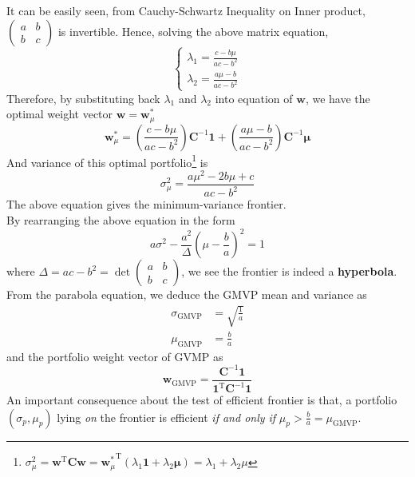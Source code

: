 \documentclass[12pt]{article}
\theoremstyle{definition}
\begin{document}
It can be easily seen, from Cauchy-Schwartz Inequality on Inner product, $\begin{pmatrix}a&b\\b&c\end{pmatrix}$ is invertible. Hence, solving the above matrix equation,
\[
\begin{cases}
\lambda_1=\frac{c-b\mu}{ac-b^2}\\
\lambda_2=\frac{a\mu-b}{ac-b^2}
\end{cases}
\]
Therefore, by substituting back $\lambda_1$ and $\lambda_2$ into equation of $\mathbf{w}$, we have the optimal weight vector $\mathbf{w}=\mathbf{w}_\mu^\ast$
\[
\mathbf{w}_\mu^\ast = \left(\frac{c-b\mu}{ac-b^2}\right)\mathbf{C}^{-1}\mathbf{1}+\left(\frac{a\mu-b}{ac-b^2}\right)\mathbf{C}^{-1}\bm{\mu}
\]
And variance of this optimal portfolio\footnote{$\sigma_\mu^2=\mathbf{w}^\text{T}\mathbf{Cw} = {\mathbf{w}_\mu^\ast}^\text{T}(\lambda_1\mathbf{1}+\lambda_2\bm{\mu})=\lambda_1+\lambda_2\mu$} is
\[
\sigma_\mu^2 = \frac{a\mu^2-2b\mu+c}{ac-b^2}
\]
The above equation gives the minimum-variance frontier.\\By rearranging the above equation in the form
\[
a\sigma^2-\frac{a^2}{\Delta}(\mu-\frac{b}{a})^2=1
\]
where $\Delta = ac-b^2=\det\begin{pmatrix}a&b\\b&c\end{pmatrix}$, we see the frontier is indeed a \textbf{hyperbola}.\\From the parabola equation, we deduce the GMVP mean and variance as
\begin{align*}
\sigma_\text{GMVP}&=\sqrt{\frac{1}{a}}\\
\mu_\text{GMVP}&=\frac{b}{a}
\end{align*}
and the portfolio weight vector of GVMP as
\[
\mathbf{w}_\text{GMVP}=\frac{\mathbf{C}^{-1}\mathbf{1}}{\mathbf{1}^\text{T}\mathbf{C}^{-1}\mathbf{1}}
\]
An important consequence about the test of efficient frontier is that, a portfolio $(\sigma_p, \mu_p)$ lying \textit{on} the frontier is efficient \textit{if and only if} $\mu_p>\frac{b}{a}=\mu_\text{GMVP}$.
\end{document}
